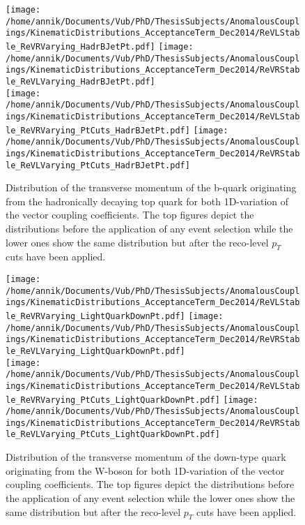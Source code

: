 \begin{figure}[!h]
 \centering
 \texttt{[image: /home/annik/Documents/Vub/PhD/ThesisSubjects/AnomalousCouplings/KinematicDistributions\_AcceptanceTerm\_Dec2014/ReVLStable\_ReVRVarying\_HadrBJetPt.pdf]}
 \texttt{[image: /home/annik/Documents/Vub/PhD/ThesisSubjects/AnomalousCouplings/KinematicDistributions\_AcceptanceTerm\_Dec2014/ReVRStable\_ReVLVarying\_HadrBJetPt.pdf]}\\
 \texttt{[image: /home/annik/Documents/Vub/PhD/ThesisSubjects/AnomalousCouplings/KinematicDistributions\_AcceptanceTerm\_Dec2014/ReVLStable\_ReVRVarying\_PtCuts\_HadrBJetPt.pdf]}
 \texttt{[image: /home/annik/Documents/Vub/PhD/ThesisSubjects/AnomalousCouplings/KinematicDistributions\_AcceptanceTerm\_Dec2014/ReVRStable\_ReVLVarying\_PtCuts\_HadrBJetPt.pdf]}
 \caption{Distribution of the transverse momentum of the b-quark originating from the hadronically decaying top quark for both 1D-variation of the vector coupling coefficients. The top figures depict the distributions before the application of any event selection while the lower ones show the same distribution but after the reco-level $p_T$ cuts have been applied.}
 \label{fig::KinChangeBJetPt}
\end{figure}

\begin{figure}[!h]
 \centering
 \texttt{[image: /home/annik/Documents/Vub/PhD/ThesisSubjects/AnomalousCouplings/KinematicDistributions\_AcceptanceTerm\_Dec2014/ReVLStable\_ReVRVarying\_LightQuarkDownPt.pdf]}
 \texttt{[image: /home/annik/Documents/Vub/PhD/ThesisSubjects/AnomalousCouplings/KinematicDistributions\_AcceptanceTerm\_Dec2014/ReVRStable\_ReVLVarying\_LightQuarkDownPt.pdf]}\\
 \texttt{[image: /home/annik/Documents/Vub/PhD/ThesisSubjects/AnomalousCouplings/KinematicDistributions\_AcceptanceTerm\_Dec2014/ReVLStable\_ReVRVarying\_PtCuts\_LightQuarkDownPt.pdf]}
 \texttt{[image: /home/annik/Documents/Vub/PhD/ThesisSubjects/AnomalousCouplings/KinematicDistributions\_AcceptanceTerm\_Dec2014/ReVRStable\_ReVLVarying\_PtCuts\_LightQuarkDownPt.pdf]}
 \caption{Distribution of the transverse momentum of the down-type quark originating from the W-boson for both 1D-variation of the vector coupling coefficients. The top figures depict the distributions before the application of any event selection while the lower ones show the same distribution but after the reco-level $p_T$ cuts have been applied.}
 \label{fig::KinChangeBJetPt}
\end{figure}

